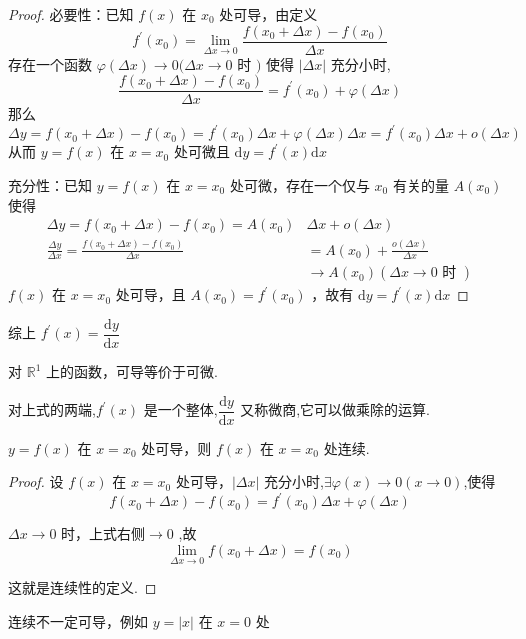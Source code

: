 \begin{proof}
	必要性：已知 $f(x)$ 在 $x_0$ 处可导，由定义
	$$f^{\prime}\left(x_0\right)=\lim _{\Delta x \rightarrow 0} \frac{f\left(x_0+\Delta x\right)-f\left(x_0\right)}{\Delta x}$$
	存在一个函数 $\varphi(\Delta x) \rightarrow 0(\Delta x \rightarrow 0$ 时 $)$
	使得 $|\Delta x|$ 充分小时,
	$$\frac{f\left(x_0+\Delta x\right)-f\left(x_0\right)}{\Delta x}=f^{\prime}\left(x_0\right)+\varphi(\Delta x)$$那么$$\Delta y=f\left(x_0+\Delta x\right)-f\left(x_0\right)=f^{\prime}\left(x_0\right) \Delta x+\varphi(\Delta x) \Delta x=f^{\prime}\left(x_0\right) \Delta x+o(\Delta x)$$
	从而 $y=f(x)$ 在 $x=x_0$ 处可微且 $\mathrm{d}y =f^{\prime}(x) \mathrm{d} x$
	
	充分性：已知 $y=f(x)$ 在 $x=x_0$ 处可微，存在一个仅与 $x_0$ 有关的量 $A(x_0)$使得
	$$\begin{aligned}
		\Delta y=f\left(x_0+\Delta x\right)-f\left(x_0\right)=A\left(x_0\right) & \Delta x+o(\Delta x) \\
		\frac{\Delta y}{\Delta x}=\frac{f\left(x_0+\Delta x\right)-f\left(x_0\right)}{\Delta x} & =A\left(x_0\right)+\frac{o(\Delta x)}{\Delta x} \\
		& \rightarrow A\left(x_0\right)(\Delta x \rightarrow 0 \text { 时 })
	\end{aligned}$$
	$f(x)$ 在 $x=x_0$ 处可导，且 $A\left(x_0\right)=f^{\prime}\left(x_0\right)$ ，故有 $\mathrm{d} y=f^{\prime}(x) \mathrm{d} x$
	
	
\end{proof}
综上 $ f^{\prime}(x)=\dfrac{\mathrm{d} y}{\mathrm{d} x}$

对 $\mathbb{R}^{1}$ 上的函数，可导等价于可微.

对上式的两端,$f^{\prime}(x)$ 是一个整体,$\dfrac{\mathrm{d} y}{\mathrm{d} x}$ 又称微商,它可以做乘除的运算.
\begin{proposition}
	$y=f(x)$ 在 $x=x_0$ 处可导，则 $f(x)$ 在 $x=x_0$ 处连续.
\end{proposition}


\begin{proof}
	设 $f(x)$ 在 $x=x_0$ 处可导，$|\Delta x|$ 充分小时,$\exists \varphi(x) \rightarrow 0(x \rightarrow 0)$,使得$$f\left(x_0+\Delta x\right)-f\left(x_0\right)=f^{\prime}\left(x_0\right) \Delta x+\varphi(\Delta x)$$
	
	$\Delta x \rightarrow 0$ 时，上式右侧$\rightarrow 0$ ,故$$\lim _{\Delta x \rightarrow 0} f\left(x_0+\Delta x\right)=f\left(x_0\right)$$
	
	这就是连续性的定义.
\end{proof}
连续不一定可导，例如 $y=|x|$ 在 $x=0$ 处


